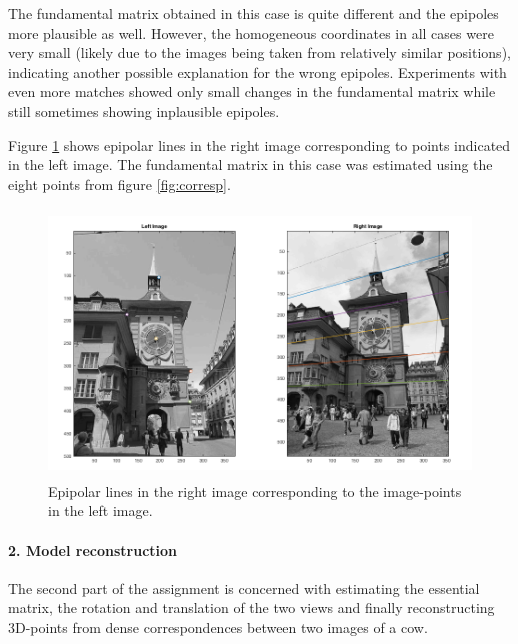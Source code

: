 \documentclass{paper}
\begin{document}
The fundamental matrix obtained in this case is quite different and the epipoles more plausible as well. However, the homogeneous coordinates in all cases were very small (likely due to the images being taken from relatively similar positions), indicating another possible explanation for the wrong epipoles. Experiments with even more matches showed only small changes in the fundamental matrix while still sometimes showing inplausible epipoles.

Figure \ref{fig:epilines} shows epipolar lines in the right image corresponding to points indicated in the left image. The fundamental matrix in this case was estimated using the eight points from figure \ref{fig:corresp}.

\begin{figure}[h!]
   \centering
   \includegraphics[height=2.8in]{epilines}
        \caption{Epipolar lines in the right image corresponding to the image-points in the left image.}
\label{fig:epilines}
\end{figure}


\paragraph{2. Model reconstruction}
The second part of the assignment is concerned with estimating the essential matrix, the rotation and translation of  the two views and finally reconstructing 3D-points from dense correspondences between two images of a cow.
\end{document}
